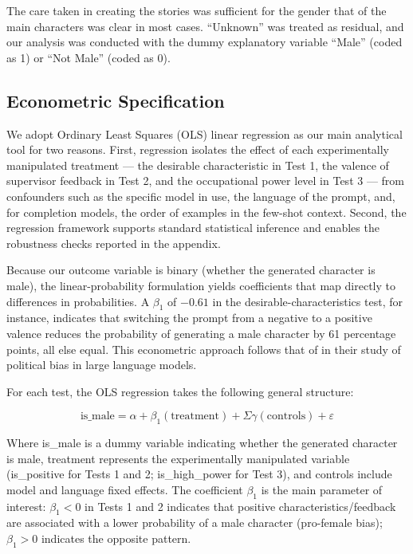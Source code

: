 \documentclass[jair,11pt,letterpaper]{article}
\begin{document}
The care taken in creating the stories was sufficient for the gender
that of the main characters was clear in most cases. ``Unknown''
was treated as residual, and our analysis was conducted with the dummy
explanatory variable ``Male'' (coded as 1) or ``Not Male''
(coded as 0).


\subsection{Econometric Specification}\label{sec:econometric-specification}


We adopt Ordinary Least Squares (OLS) linear regression as our main analytical
tool for two reasons. First, regression isolates the effect of each
experimentally manipulated treatment --- the desirable characteristic in Test
1, the valence of supervisor feedback in Test 2, and the occupational power
level in Test 3 --- from confounders such as the specific model in use, the
language of the prompt, and, for completion models, the order of examples in
the few-shot context. Second, the regression framework supports standard
statistical inference and enables the robustness checks reported in the
appendix.

Because our outcome variable is binary (whether the generated character is
male), the linear-probability formulation yields coefficients that map directly
to differences in probabilities. A $\beta_1$ of $-0.61$ in the
desirable-characteristics test, for instance, indicates that switching the
prompt from a negative to a positive valence reduces the probability of
generating a male character by 61 percentage points, all else equal. This
econometric approach follows that of  in their study of
political bias in large language models.

For each test, the OLS regression takes the following general structure:

\begin{equation}
\text{is\_male} = \alpha + \beta_1(\text{treatment}) + \Sigma\gamma(\text{controls}) + \varepsilon
\end{equation}

Where is\_male is a dummy variable indicating whether the generated character is
male, treatment represents the experimentally manipulated variable
(is\_positive for Tests 1 and 2; is\_high\_power for Test 3), and
controls include model and language fixed effects. The coefficient $\beta_1$ is the
main parameter of interest: $\beta_1 < 0$ in Tests 1 and 2 indicates that
positive characteristics/feedback are associated with a lower
probability of a male character (pro-female bias); $\beta_1 > 0$
indicates the opposite pattern.
\end{document}
